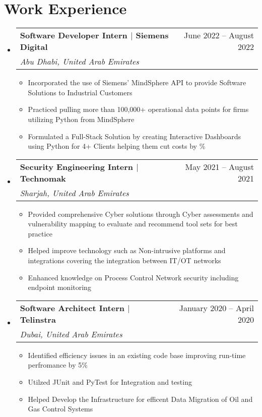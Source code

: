 \documentclass[letterpaper,10.5pt]{article}
\makeatletter
\newcommand{\resumeItem}[1]{
  \item\small{
    {#1 \vspace{-2pt}}
  }
}
\newcommand{\resumeSubheading}[4]{
  \vspace{-2pt}\item
    \begin{tabular*}{0.97\textwidth}[t]{l@{\extracolsep{\fill}}r}
      \textbf{#1} & #2 \\
      \textit{\small#3} & \textit{\small #4} \\
    \end{tabular*}\vspace{-7pt}
}
\newcommand{\resumeSubSubheading}[2]{
    \item
    \begin{tabular*}{0.97\textwidth}{l@{\extracolsep{\fill}}r}
      \textit{\small#1} & \textit{\small #2} \\
    \end{tabular*}\vspace{-7pt}
}
\newcommand{\resumeSubHeadingListStart}{\begin{itemize}[leftmargin=0.15in, label={}]}
\newcommand{\resumeSubHeadingListEnd}{\end{itemize}}
\newcommand{\resumeItemListStart}{\begin{itemize}}
\newcommand{\resumeItemListEnd}{\end{itemize}\vspace{-5pt}}
\makeatother
\begin{document}
\section{Work Experience}
  \resumeSubHeadingListStart
    \resumeSubheading
      {Software Developer Intern $|$ Siemens Digital}{June 2022 -- August 2022}
      {Abu Dhabi, United Arab Emirates}{}
      \resumeItemListStart
        \resumeItem{Incorporated the use of Siemens' MindSphere API to provide Software Solutions to Industrial Customers }
        \resumeItem{Practiced pulling more than 100,000+ operational data points for firms utilizing Python from MindSphere}
        \resumeItem{ Formulated a Full-Stack Solution by creating Interactive Dashboards using Python for 4+ Clients helping them cut costs by \geq 10 \% }
        
      \resumeItemListEnd
      

    \resumeSubheading
       {Security Engineering Intern $|$ Technomak}{May 2021 -- August 2021}
      {Sharjah, United Arab Emirates}{}
      \resumeItemListStart
        \resumeItem{Provided comprehensive Cyber solutions through Cyber assessments and vulnerability mapping  to evaluate and recommend tool sets for best practice
}
        \resumeItem{Helped improve technology such as Non-intrusive platforms and integrations covering the integration between IT/OT networks
}
        \resumeItem{Enhanced knowledge on Process Control Network security including endpoint monitoring }
    \resumeItemListEnd

    \resumeSubheading
      {Software Architect Intern $|$ Telinstra}{January 2020 -- April 2020}
      {Dubai, United Arab Emirates}{}
      \resumeItemListStart
        \resumeItem{Identified efficiency issues in an existing code base improving run-time perfromance by 5\% }
        \resumeItem{Utilzed JUnit and PyTest for Integration and testing}
        \resumeItem{Helped Develop the Infrastructure for efficent Data Migration of Oil and Gas Control Systems}
      \resumeItemListEnd

  \resumeSubHeadingListEnd
\end{document}
